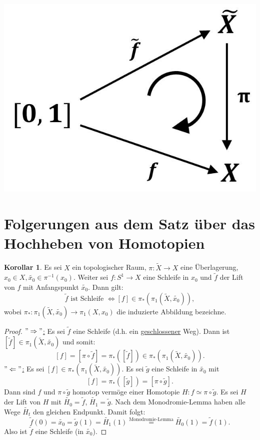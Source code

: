 \documentclass[a4paper,11pt,notitlepage]{report}
\theoremstyle{definition}
\newtheorem{corollary}{Korollar}[chapter]
\begin{document}
\begin{center}
	\includegraphics[scale=0.5]{images/2011_12_19_Bild2.jpg}
\end{center}

\section{Folgerungen aus dem Satz über das Hochheben von Homotopien}
\begin{corollary}
	Es sei $X$ ein topologischer Raum, $\pi \colon \widetilde{X} \rightarrow X$ eine Überlagerung, $x_0 \in X, \widetilde{x_0} \in \pi^{-1}(x_0)$. Weiter sei $f \colon S^1 \rightarrow X$ eine Schleife in $x_0$ und $\widetilde{f}$ der Lift von $f$ mit Anfangspunkt $\widetilde{x_0}$. Dann gilt:
	$$\widetilde{f} \text{ ist Schleife } \Leftrightarrow [f] \in \pi_*(\pi_1(\widetilde{X}, \widetilde{x_0})),$$
	wobei $\pi_* \colon \pi_1(\widetilde{X}, \widetilde{x_0}) \rightarrow \pi_1(X,x_0)$ die induzierte Abbildung bezeichne.
\end{corollary}

\begin{proof}
	\underline{$"\Rightarrow"$:} Es sei $\widetilde{f}$ eine Schleife (d.h. ein \underline{geschlossener} Weg). Dann ist $[\widetilde{f}] \in \pi_1(\widetilde{X}, \widetilde{x_0})$ und somit:
	$$[f] = [\pi \circ \widetilde{f}] = \pi_*([\widetilde{f}]) \in \pi_*(\pi_1(\widetilde{X}, \widetilde{x_0})).$$
	\underline{$"\Leftarrow"$:} Es sei $[f] \in \pi_*(\pi_1(\widetilde{X}, \widetilde{x_0}))$.
	\newline
	Es sei $\widetilde{g}$ eine Schleife in $\widetilde{x_0}$ mit
	$$[f] = \pi_*([\widetilde{g}]) = [\pi \circ \widetilde{g}].$$
	Dann sind $f$ und $\pi \circ \widetilde{g}$ homotop vermöge einer Homotopie $H \colon f \simeq \pi \circ \widetilde{g}$. Es sei $H$ der Lift von $H$ mit $\widetilde{H_0} = \widetilde{f}$, $\widetilde{H_1} = \widetilde{g}$.
	\newline
	Nach dem Monodromie-Lemma haben alle Wege $\widetilde{H_t}$ den gleichen Endpunkt. Damit folgt:
	$$\widetilde{f}(0) = \widetilde{x_0} = \widetilde{g}(1) = \widetilde{H_1}(1) \overset{\text{Monodromie-Lemma}}{=} \widetilde{H_0}(1) = \widetilde{f}(1).$$
	Also ist $\widetilde{f}$ eine Schleife (in $\widetilde{x_0}$).
\end{proof}
\end{document}
